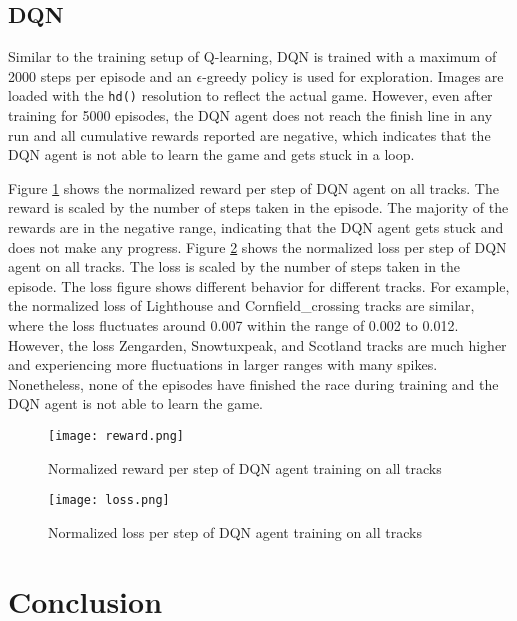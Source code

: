 \documentclass{article}
\begin{document}
\subsection{DQN}
Similar to the training setup of Q-learning, DQN is trained with a maximum of 2000 steps per episode and an $\epsilon$-greedy policy is used for exploration. Images are loaded with the \texttt{hd()} resolution to reflect the actual game. However, even after training for 5000 episodes, the DQN agent does not reach the finish line in any run and all cumulative rewards reported are negative, which indicates that the DQN agent is not able to learn the game and gets stuck in a loop.

Figure \ref{DQN_reward} shows the normalized reward per step of DQN agent on all tracks. The reward is scaled by the number of steps taken in the episode. The majority of the rewards are in the negative range, indicating that the DQN agent gets stuck and does not make any progress. Figure \ref{DQN_loss} shows the normalized loss per step of DQN agent on all tracks. The loss is scaled by the number of steps taken in the episode. The loss figure shows different behavior for different tracks. For example, the normalized loss of Lighthouse and Cornfield\_crossing tracks are similar, where the loss fluctuates around 0.007 within the range of 0.002 to 0.012. However, the loss Zengarden, Snowtuxpeak, and Scotland tracks are much higher and experiencing more fluctuations in larger ranges with many spikes. Nonetheless, none of the episodes have finished the race during training and the DQN agent is not able to learn the game.

\begin{figure}[h]
    \centering
    \texttt{[image: reward.png]}
    \caption{Normalized reward per step of DQN agent training on all tracks}
    \label{DQN_reward}
\end{figure}

\begin{figure}[h]
    \centering
    \texttt{[image: loss.png]}
    \caption{Normalized loss per step of DQN agent training on all tracks}
    \label{DQN_loss}
\end{figure}


\section{Conclusion}
\end{document}
